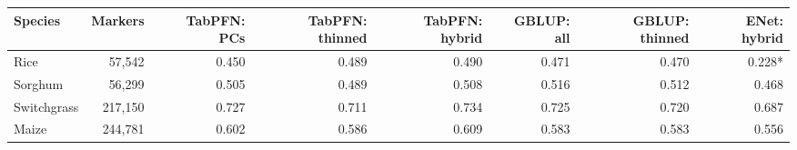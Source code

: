 \begin{tabular}{lrrrrrrr}
\toprule
Species & Markers & TabPFN: PCs & TabPFN: thinned & TabPFN: hybrid & GBLUP: all & GBLUP: thinned & ENet: hybrid \\
\midrule
Rice & 57,542 & 0.450 & 0.489 & 0.490 & 0.471 & 0.470 & 0.228* \\
Sorghum & 56,299 & 0.505 & 0.489 & 0.508 & 0.516 & 0.512 & 0.468 \\
Switchgrass & 217,150 & 0.727 & 0.711 & 0.734 & 0.725 & 0.720 & 0.687 \\
Maize & 244,781 & 0.602 & 0.586 & 0.609 & 0.583 & 0.583 & 0.556 \\
\bottomrule
\end{tabular}
